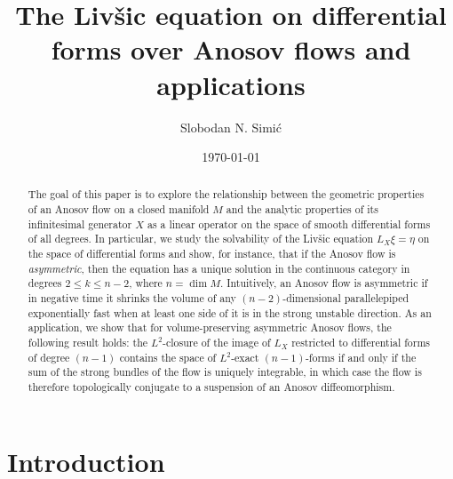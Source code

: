 \documentclass[11pt,letterpaper,reqno,abstract=true]{scrartcl}
\theoremstyle{plain}                              %
\theoremstyle{definition}                         %
\theoremstyle{remark}                             %
\begin{document}
\title{The Liv\v{s}ic equation on differential forms over Anosov flows
  and applications}

\author{Slobodan N. Simi\'c}

\maketitle


\begin{abstract}
%
  The goal of this paper is to explore the relationship between the
  geometric properties of an Anosov flow on a closed manifold $M$ and
  the analytic properties of its infinitesimal generator $X$ as a
  linear operator on the space of smooth differential forms of all
  degrees. In particular, we study the solvability of the Liv\v{s}ic
  equation $L_X \xi = \eta$ on the space of differential forms and
  show, for instance, that if the Anosov flow is \emph{asymmetric},
  then the equation has a unique solution in the continuous category
  in degrees $2 \leq k \leq n-2$, where $n = \dim M$. Intuitively, an
  Anosov flow is asymmetric if in negative time it shrinks the volume
  of any $(n-2)$-dimensional parallelepiped exponentially fast when at
  least one side of it is in the strong unstable direction. As an
  application, we show that for volume-preserving asymmetric Anosov
  flows, the following result holds: the $L^2$-closure of the image of
  $L_X$ restricted to differential forms of degree $(n-1)$ contains
  the space of $L^2$-exact $(n-1)$-forms if and only if the sum of the
  strong bundles of the flow is uniquely integrable, in which case the
  flow is therefore topologically conjugate to a suspension of an
  Anosov diffeomorphism.
%
\end{abstract}








\date{\today}


%


\section{Introduction}
\label{sec:introduction}
\end{document}
